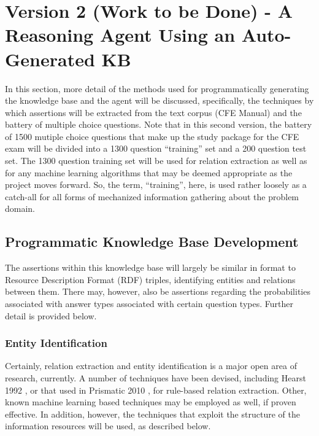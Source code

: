  
\chapter{Version 2 (Work to be Done) - A Reasoning Agent Using an Auto-Generated KB}

In this section, more detail of the methods used for programmatically generating the knowledge
base and the agent will be discussed, specifically, the techniques by which assertions will be 
extracted from the text corpus (CFE Manual) and the battery of multiple choice questions.  Note that
in this second version, the battery of 1500 mutiple choice questions that make up the study package 
for the CFE exam will be divided into a 1300 question ``training'' set and a 200 question test set.
The 1300 question training set will be used for relation extraction as well as for any machine learning
algorithms that may be deemed appropriate as the project moves forward.  So, the term, ``training'', 
here, is used rather loosely as a catch-all for all forms of mechanized information gathering about the
problem domain.

\section{Programmatic Knowledge Base Development}

The assertions within
this knowledge base will largely be similar in format to Resource Description Format (RDF) triples, identifying entities and relations between them.  There may, however, also be assertions regarding the 
probabilities associated with answer types associated with certain question types.  Further detail is 
provided below.

\subsection{Entity Identification}

Certainly, relation extraction and entity identification is a major open area of research, currently.  A 
number of techniques have been devised, including Hearst 1992 \cite{hearst1992automatic}, or that used in Prismatic 2010 \cite{fan2012automatic}, for rule-based relation extraction.  Other, known machine learning based techniques may be employed as well,
if proven effective.  In addition, however, the techniques that exploit the structure of the 
information resources will be used, as described below.

